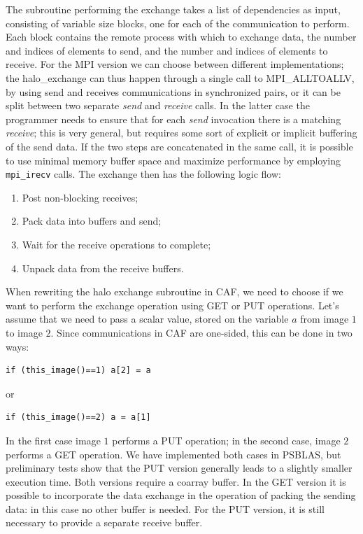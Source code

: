 \documentclass{IOS-Book-Article}
\begin{document}
The subroutine performing the exchange takes a list of dependencies as
input, consisting  of variable size blocks, one for each of the
communication to perform. Each  block contains the remote process with
which to  exchange data, the number and indices of elements to send,
and the number and indices of elements to receive.
For the MPI version we can choose between different implementations; 
the halo\_exchange can thus happen through a single call to
MPI\_ALLTOALLV, by using send and receives communications in
synchronized pairs, or it can be split between 
two separate \emph{send} and \emph{receive} calls. In the latter case
the programmer needs to ensure that for each \emph{send} invocation
there is a matching \emph{receive}; this is very general, but requires
some sort of explicit or implicit buffering of the send data. 
If the two steps are concatenated in the same call, it is possible to
use minimal memory buffer space and maximize performance by employing 
\verb|mpi_irecv| calls.
The exchange then has the following logic flow: 
\begin{enumerate}
  \item Post non-blocking receives;
  \item Pack data into buffers and send; 
  \item Wait for the receive operations to complete; 
  \item Unpack data from the receive buffers. 
\end{enumerate} 
When rewriting the halo exchange subroutine in CAF, we need to choose
if we want to perform the exchange operation using GET or PUT
operations.  
Let's assume that we need to pass a scalar value, stored on the
variable $a$ from image $1$ to image $2$. Since communications in CAF
are one-sided, this can be done in two ways: 
\lstset{language=Fortran} 
\begin{lstlisting}
if (this_image()==1) a[2] = a
\end{lstlisting}
or
\begin{lstlisting}
if (this_image()==2) a = a[1]
\end{lstlisting}
In the first case image $1$ performs a PUT operation; in the second
case, image $2$ performs a GET operation. We have implemented both
cases in PSBLAS, but preliminary tests  show that the PUT version
generally leads to a slightly smaller execution time.
Both versions require a coarray buffer. In the GET version it is
possible to incorporate the data exchange in the operation of packing
the sending data: in this case no other buffer is needed. For the PUT
version, it is still necessary to provide a separate receive buffer.
\end{document}
